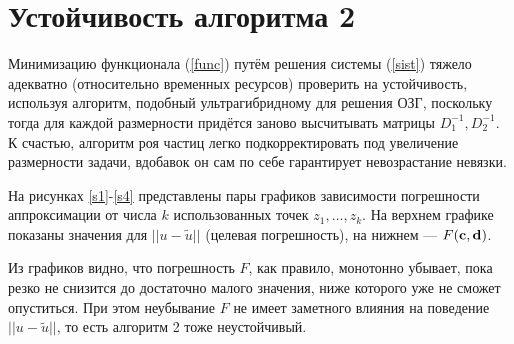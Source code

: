 \documentclass[a4paper, 12pt]{article}
\begin{document}
\section{Устойчивость алгоритма 2}
Минимизацию функционала (\ref{func}) путём решения системы (\ref{sist}) тяжело адекватно (относительно временных ресурсов) проверить на устойчивость,
используя алгоритм, подобный ультрагибридному для решения ОЗГ, поскольку тогда для каждой размерности придётся заново высчитывать матрицы $D_1^{-1}, D_2^{-1}$.
К счастью, алгоритм роя частиц легко подкорректировать под увеличение размерности задачи, вдобавок он сам по себе гарантирует невозрастание невязки.

На рисунках \ref{s1}-\ref{s4} представлены пары графиков зависимости погрешности аппроксимации от числа $k$ использованных точек $z_1,\dots, z_k$.
На верхнем графике показаны значения для $||u - \tilde{u} ||$ (целевая погрешность), на нижнем --- $F({\bf c},{\bf d})$.

Из графиков видно, что погрешность $F$, как правило, монотонно убывает, пока резко не снизится до достаточно малого значения, ниже которого уже не сможет опуститься.
При этом неубывание $F$ не имеет заметного влияния на поведение $||u - \tilde{u} ||$, то есть алгоритм 2 тоже неустойчивый.
\end{document}
